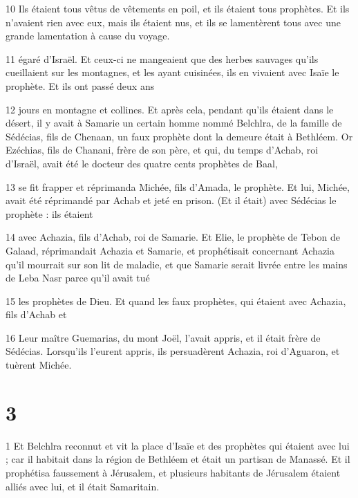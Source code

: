 \par 10 Ils étaient tous vêtus de vêtements en poil, et ils étaient tous prophètes. Et ils n'avaient rien avec eux, mais ils étaient nus, et ils se lamentèrent tous avec une grande lamentation à cause du voyage.

\par 11 égaré d'Israël. Et ceux-ci ne mangeaient que des herbes sauvages qu'ils cueillaient sur les montagnes, et les ayant cuisinées, ils en vivaient avec Isaïe le prophète. Et ils ont passé deux ans

\par 12 jours en montagne et collines. Et après cela, pendant qu'ils étaient dans le désert, il y avait à Samarie un certain homme nommé Belchlra, de la famille de Sédécias, fils de Chenaan, un faux prophète dont la demeure était à Bethléem. Or Ezéchias, fils de Chanani, frère de son père, et qui, du temps d'Achab, roi d'Israël, avait été le docteur des quatre cents prophètes de Baal,

\par 13 se fit frapper et réprimanda Michée, fils d'Amada, le prophète. Et lui, Michée, avait été réprimandé par Achab et jeté en prison. (Et il était) avec Sédécias le prophète : ils étaient

\par 14 avec Achazia, fils d'Achab, roi de Samarie. Et Elie, le prophète de Tebon de Galaad, réprimandait Achazia et Samarie, et prophétisait concernant Achazia qu'il mourrait sur son lit de maladie, et que Samarie serait livrée entre les mains de Leba Nasr parce qu'il avait tué

\par 15 les prophètes de Dieu. Et quand les faux prophètes, qui étaient avec Achazia, fils d'Achab et

\par 16 Leur maître Guemarias, du mont Joël, l'avait appris, et il était frère de Sédécias. Lorsqu'ils l'eurent appris, ils persuadèrent Achazia, roi d'Aguaron, et tuèrent Michée.

\chapter{3}

\par 1 Et Belchlra reconnut et vit la place d'Isaïe et des prophètes qui étaient avec lui ; car il habitait dans la région de Bethléem et était un partisan de Manassé. Et il prophétisa faussement à Jérusalem, et plusieurs habitants de Jérusalem étaient alliés avec lui, et il était Samaritain.

